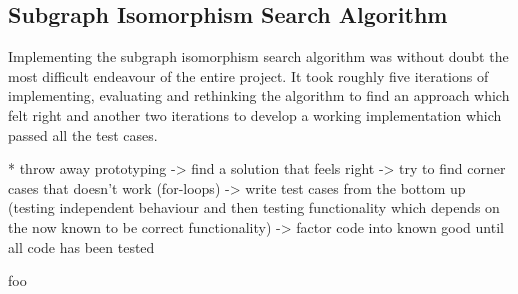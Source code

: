 
\subsection{Subgraph Isomorphism Search Algorithm}
\label{sec:impl_subgraph_isomorphism_search_algorithm}

Implementing the subgraph isomorphism search algorithm was without doubt the most difficult endeavour of the entire project. It took roughly five iterations of implementing, evaluating and rethinking the algorithm to find an approach which felt right and another two iterations to develop a working implementation which passed all the test cases.

* throw away prototyping -> find a solution that feels right -> try to find corner cases that doesn't work (for-loops) -> write test cases from the bottom up (testing independent behaviour and then testing functionality which depends on the now known to be correct functionality) -> factor code into known good until all code has been tested

foo

%




